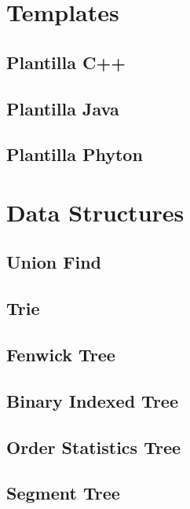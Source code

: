 \section{Templates}
\subsection{Plantilla C++}
\raggedbottom
\hrulefill
\subsection{Plantilla Java}
\raggedbottom
\hrulefill
\subsection{Plantilla Phyton}
\raggedbottom
\hrulefill

\section{Data Structures}
\subsection{Union Find}
\raggedbottom
\hrulefill
\subsection{Trie}
\raggedbottom
\hrulefill
\subsection{Fenwick Tree}
\raggedbottom
\hrulefill
\subsection{Binary Indexed Tree}
\raggedbottom
\hrulefill
\subsection{Order Statistics Tree}
\raggedbottom
\hrulefill
\subsection{Segment Tree}
\raggedbottom
\hrulefill
